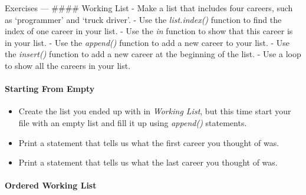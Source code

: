 \documentclass[11pt]{article}
\providecommand{\tightlist}{%
      \setlength{\itemsep}{0pt}\setlength{\parskip}{0pt}}
\begin{document}
    Exercises --- \#\#\#\# Working List - Make a list that includes four
careers, such as `programmer' and `truck driver'. - Use the
\emph{list.index()} function to find the index of one career in your
list. - Use the \emph{in} function to show that this career is in your
list. - Use the \emph{append()} function to add a new career to your
list. - Use the \emph{insert()} function to add a new career at the
beginning of the list. - Use a loop to show all the careers in your
list.

\hypertarget{starting-from-empty}{%
\paragraph{Starting From Empty}\label{starting-from-empty}}

\begin{itemize}
\tightlist
\item
  Create the list you ended up with in \emph{Working List}, but this
  time start your file with an empty list and fill it up using
  \emph{append()} statements.
\item
  Print a statement that tells us what the first career you thought of
  was.
\item
  Print a statement that tells us what the last career you thought of
  was.
\end{itemize}

\hypertarget{ordered-working-list}{%
\paragraph{Ordered Working List}\label{ordered-working-list}}
\end{document}
